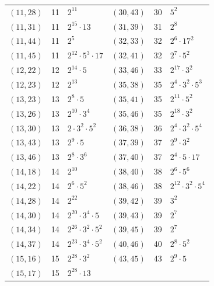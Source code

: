 \documentclass[11pt]{article}
\begin{document}
\begin{longtable}{@{}lrl@{\qquad}lrl@{}}
$(11,28)$ & 11 & $2^{11}$ & $(30,43)$ & 30 & $5^{2}$\\
$(11,31)$ & 11 & $2^{15}\cdot 13$ & $(31,39)$ & 31 & $2^{8}$\\
$(11,44)$ & 11 & $2^{5}$ & $(32,33)$ & 32 & $2^{6}\cdot 17^{2}$\\
$(11,45)$ & 11 & $2^{12}\cdot 5^{3}\cdot 17$ & $(32,41)$ & 32 & $2^{7}\cdot 5^{2}$\\
$(12,22)$ & 12 & $2^{14}\cdot 5$ & $(33,46)$ & 33 & $2^{17}\cdot 3^{2}$\\
$(12,23)$ & 12 & $2^{13}$ & $(35,38)$ & 35 & $2^{4}\cdot 3^{2}\cdot 5^{3}$\\
$(13,23)$ & 13 & $2^{8}\cdot 5$ & $(35,41)$ & 35 & $2^{11}\cdot 5^{2}$\\
$(13,26)$ & 13 & $2^{10}\cdot 3^{4}$ & $(35,46)$ & 35 & $2^{18}\cdot 3^{2}$\\
$(13,30)$ & 13 & $2\cdot 3^{2}\cdot 5^{2}$ & $(36,38)$ & 36 & $2^{4}\cdot 3^{2}\cdot 5^{4}$\\
$(13,43)$ & 13 & $2^{9}\cdot 5$ & $(37,39)$ & 37 & $2^{9}\cdot 3^{2}$\\
$(13,46)$ & 13 & $2^{8}\cdot 3^{6}$ & $(37,40)$ & 37 & $2^{4}\cdot 5\cdot 17$\\
$(14,18)$ & 14 & $2^{10}$ & $(38,40)$ & 38 & $2^{6}\cdot 5^{6}$\\
$(14,22)$ & 14 & $2^{6}\cdot 5^{2}$ & $(38,46)$ & 38 & $2^{12}\cdot 3^{2}\cdot 5^{4}$\\
$(14,28)$ & 14 & $2^{22}$ & $(39,42)$ & 39 & $3^{2}$\\
$(14,30)$ & 14 & $2^{20}\cdot 3^{4}\cdot 5$ & $(39,43)$ & 39 & $2^{7}$\\
$(14,34)$ & 14 & $2^{26}\cdot 3^{2}\cdot 5^{2}$ & $(39,45)$ & 39 & $2^{7}$\\
$(14,37)$ & 14 & $2^{23}\cdot 3^{4}\cdot 5^{2}$ & $(40,46)$ & 40 & $2^{8}\cdot 5^{2}$\\
$(15,16)$ & 15 & $2^{28}\cdot 3^{2}$ & $(43,45)$ & 43 & $2^{9}\cdot 5$\\
$(15,17)$ & 15 & $2^{28}\cdot 13$ & & &\\
\end{longtable}
\endgroup
\end{document}
